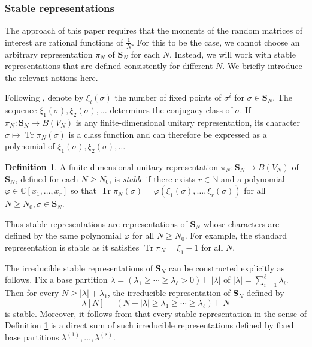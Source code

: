 \documentclass[10pt,reqno]{amsart}
\theoremstyle{definition}
\newtheorem{defn}[thm]{Definition}
\theoremstyle{remark}
\numberwithin{equation}{section}
\numberwithin{figure}{section}
\numberwithin{table}{section}
\newcommand{\tr}{\mathop{\mathrm{Tr}}}
\begin{document}
\subsubsection{Stable representations}
\label{sec:stabrep}

The approach of this paper requires that the moments of the 
random matrices of interest are rational functions of $\frac{1}{N}$. For 
this to be the case, we cannot choose an arbitrary representation $\pi_N$ 
of $\mathbf{S}_N$ for each $N$. Instead, we will work with stable 
representations \cite{Far14,CEF15} that are defined consistently for 
different $N$. We briefly introduce the relevant notions here.

Following \cite{HP23}, denote by $\xi_i(\sigma)$ the number of fixed 
points of $\sigma^i$ for $\sigma\in\mathbf{S}_N$. The sequence 
$\xi_1(\sigma),\xi_2(\sigma),\ldots$ determines the conjugacy class of 
$\sigma$. If $\pi_N:\mathbf{S}_N\to B(V_N)$ is any finite-dimensional 
unitary representation, its character $\sigma\mapsto\tr \pi_N(\sigma)$ is 
a class function and can therefore be expressed as a polynomial of 
$\xi_1(\sigma),\xi_2(\sigma),\ldots$

\begin{defn}
\label{def:stable}
A finite-dimensional unitary representation
$\pi_N:\mathbf{S}_N\to B(V_N)$ of $\mathbf{S}_N$, defined for each $N\ge 
N_0$, is \emph{stable} if there exists $r\in\mathbb{N}$
and a polynomial $\varphi\in\mathbb{C}[x_1,\ldots,x_r]$ so that
$\tr \pi_N(\sigma) = \varphi(\xi_1(\sigma),\ldots,\xi_r(\sigma))$
for all $N\ge N_0,\sigma\in\mathbf{S}_N$.
\end{defn}

Thus stable representations are representations of $\mathbf{S}_N$ whose 
characters are defined by the same polynomial $\varphi$ for all $N\ge 
N_0$. For example, the standard representation is stable as it satisfies 
$\tr \pi_N=\xi_1-1$ for all $N$.

The irreducible stable representations of $\mathbf{S}_N$ can be 
constructed explicitly as follows. 
Fix a base partition $\lambda=(\lambda_1\ge\cdots\ge\lambda_\ell>0) 
\vdash|\lambda|$ of $|\lambda|=\sum_{i=1}^\ell\lambda_i$. Then for every 
$N\ge|\lambda|+\lambda_1$, the irreducible representation of 
$\mathbf{S}_N$ defined by
\begin{equation}
\label{eq:stablelambda}
	\lambda[N]=(N-|\lambda|\ge\lambda_1\ge\cdots\ge\lambda_\ell) \vdash N
\end{equation}
is stable. Moreover, it follows from \cite[Proposition B.2]{HP23} that 
every stable representation in the sense of Definition \ref{def:stable} is 
a direct sum of such irreducible representations defined by fixed 
base partitions $\lambda^{(1)},\ldots,\lambda^{(s)}$.
\end{document}
